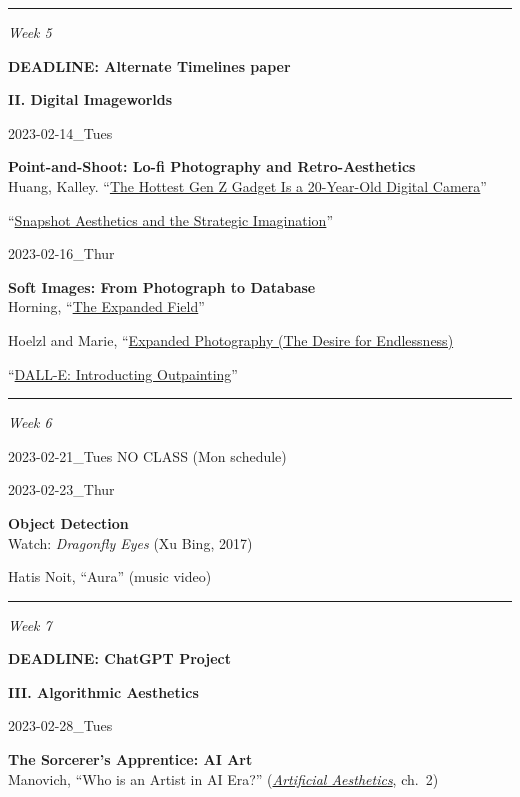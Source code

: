 \documentclass[
  letterpaper,
  DIV=11,
  numbers=noendperiod]{scrartcl}
\begin{document}
\begin{center}\rule{0.5\linewidth}{0.5pt}\end{center}

\emph{Week 5}

\textbf{DEADLINE: Alternate Timelines paper}

\textbf{II. Digital Imageworlds}

2023-02-14\_Tues

\textbf{Point-and-Shoot: Lo-fi Photography and Retro-Aesthetics}\\
Huang, Kalley. ``\href{pdf/nyt-digital-camera.pdf}{The Hottest Gen Z
Gadget Is a 20-Year-Old Digital Camera}''

``\href{http://ivc.lib.rochester.edu/snapshot-aesthetics-and-the-strategic-imagination/}{Snapshot
Aesthetics and the Strategic Imagination}''

2023-02-16\_Thur

\textbf{Soft Images: From Photograph to Database}\\
Horning,
``\href{https://robhorning.substack.com/p/the-expanded-field}{The
Expanded Field}''

Hoelzl and Marie,
``\href{pdf/softimage-expanded-photography\%22\%20in\%20*Softimage*}{Expanded
Photography (The Desire for Endlessness)}

``\href{https://openai.com/blog/dall-e-introducing-outpainting/}{DALL-E:
Introducting Outpainting}''

\begin{center}\rule{0.5\linewidth}{0.5pt}\end{center}

\emph{Week 6}

2023-02-21\_Tues NO CLASS (Mon schedule)

2023-02-23\_Thur

\textbf{Object Detection}\\
Watch: \emph{Dragonfly Eyes} (Xu Bing, 2017)

Hatis Noit, ``Aura'' (music video)

\begin{center}\rule{0.5\linewidth}{0.5pt}\end{center}

\emph{Week 7}

\textbf{DEADLINE: ChatGPT Project}

\textbf{III. Algorithmic Aesthetics}

2023-02-28\_Tues

\textbf{The Sorcerer's Apprentice: AI Art}\\
Manovich, ``Who is an Artist in AI Era?''
(\href{http://manovich.net/index.php/projects/artificial-aesthetics-book}{\emph{Artificial
Aesthetics}}, ch.~2)
\end{document}

